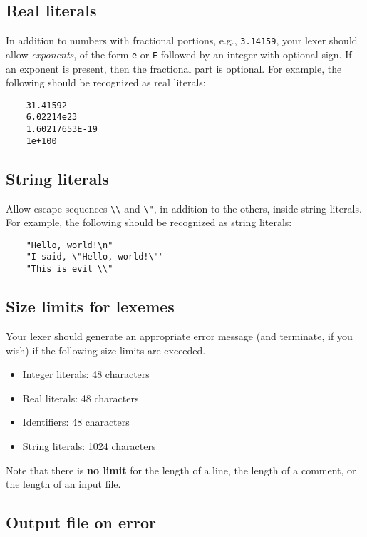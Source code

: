 \documentclass{article}
\begin{document}
\subsection{Real literals}
\label{SEC:reals}

In addition to numbers with fractional portions,
e.g., \verb|3.14159|,
your lexer should allow \emph{exponents},
of the form \verb|e| or \verb|E| followed by an integer with optional sign.
If an exponent is present, then the fractional part is optional.
For example,
the following should be recognized as real literals:
\begin{verbatim}
	31.41592
	6.02214e23
	1.60217653E-19
	1e+100
\end{verbatim}

\subsection{String literals}
\label{SEC:strings}

Allow escape sequences \verb|\\| and \verb|\"|,
in addition to the others, inside string literals.
For example, the following should be recognized as string literals:
\begin{verbatim}
	"Hello, world!\n"
	"I said, \"Hello, world!\""
	"This is evil \\"
\end{verbatim}

\subsection{Size limits for lexemes}
\label{SEC:sizes}

Your lexer should generate an appropriate error message
(and terminate, if you wish)
if the following size limits are exceeded.
\begin{itemize}
	\item Integer literals: 48 characters
	\item Real literals: 48 characters
	\item Identifiers: 48 characters
	\item String literals: 1024 characters
\end{itemize}
Note that there is {\bf no limit} for
the length of a line,
the length of a comment,
or the length of an input file.

\subsection{Output file on error}
\label{SEC:remove}
\end{document}
